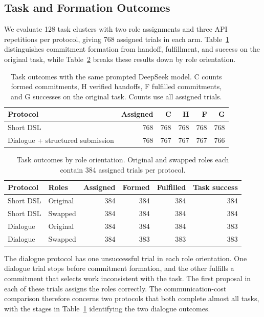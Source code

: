 \documentclass[sigconf,nonacm,balance=false]{aamas}
\newcommand{\tabstyle}{\small\setlength{\tabcolsep}{3pt}\renewcommand{\arraystretch}{1.10}}
\begin{document}
\subsection{Task and Formation Outcomes}
We evaluate 128 task clusters with two role assignments and three API repetitions per protocol, giving 768 assigned trials in each arm. Table~\ref{tab:prompted-quality-complete} distinguishes commitment formation from handoff, fulfillment, and success on the original task, while Table~\ref{tab:prompted-role} breaks these results down by role orientation.

\begin{table}[!htbp]
\centering\tabstyle
\caption{Task outcomes with the same prompted DeepSeek model. C counts formed commitments, H verified handoffs, F fulfilled commitments, and G successes on the original task. Counts use all assigned trials.}
\label{tab:prompted-quality-complete}
\begin{tabular}{@{}lrrrrr@{}}\toprule
Protocol & Assigned & C & H & F & G\\\midrule
Short DSL & 768 & 768 & 768 & 768 & 768\\
Dialogue + structured submission & 768 & 767 & 767 & 767 & 766\\\bottomrule
\end{tabular}
\end{table}

\begin{table}[!htbp]
\centering\tabstyle
\caption{Task outcomes by role orientation. Original and swapped roles each contain 384 assigned trials per protocol.}
\label{tab:prompted-role}
\begin{tabular}{@{}llrrrr@{}}\toprule
Protocol & Roles & Assigned & Formed & Fulfilled & Task success\\\midrule
Short DSL & Original & 384 & 384 & 384 & 384\\
Short DSL & Swapped & 384 & 384 & 384 & 384\\
Dialogue & Original & 384 & 384 & 384 & 383\\
Dialogue & Swapped & 384 & 383 & 383 & 383\\\bottomrule
\end{tabular}
\end{table}

The dialogue protocol has one unsuccessful trial in each role orientation. One dialogue trial stops before commitment formation, and the other fulfills a commitment that selects work inconsistent with the task. The first proposal in each of these trials assigns the roles correctly. The communication-cost comparison therefore concerns two protocols that both complete almost all tasks, with the stages in Table~\ref{tab:prompted-quality-complete} identifying the two dialogue outcomes.
\end{document}
